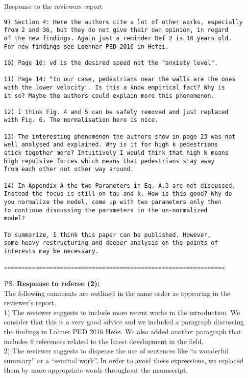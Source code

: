 \documentclass[a4paper,12pt]{letter}
\begin{document}
\begin{letter}{Response to the reviewers report}
\begin{verbatim}
9) Section 4: Here the authors cite a lot of other works, especially 
from 2 and 36, but they do not give their own opinion, in regard 
of the new findings. Again just a reminder Ref 2 is 10 years old. 
For new findings see Loehner PED 2016 in Hefei.

10) Page 10: vd is the desired speed not the "anxiety level".

11) Page 14: "In our case, pedestrians near the walls are the ones 
with the lower velocity". Is this a know empirical fact? Why is 
it so? Maybe the authors could explain more this phenomenon. 

12) I think Fig. 4 and 5 can be safely removed and just replaced 
with Fig. 6. The normalisation here is nice.

13) The interesting phenomenon the authors show in page 23 was not 
well analysed and explained. Why is it for high k pedestrians 
stick together more? Intuitively I would think that high k means 
high repulsive forces which means that pedestrians stay away 
from each other not other way around.

14) In Appendix A the two Parameters in Eq. A.3 are not discussed. 
Instead the focus is still on tau and k. How is this good? Why do 
you normalize the model, come up with two parameters only then 
to continue discussing the parameters in the un-normalized 
model?

To summarize, I think this paper can be published. However, 
some heavy restructuring and deeper analysis on the points of 
interests may be necessary. 

===============================================================

\end{verbatim}


\ps{\textbf{Response to referee (2):} \\

The following comments are outlined in the same order as appearing in the
reviewer’s report. \\

1) The reviewer suggests to include more recent works in the introduction. We consider that this
is a very good advice and we included a paragraph discussing the findings in L\"ohner PED 2016 Hefei.
We also added another paragraph that includes 6 references related to the latest development in the field. \\

2) The reviewer suggests to dispense the use of sentences like ``a wonderful 
summary'' or a ``seminal work''. In order to avoid these expressions, we 
replaced them by more appropriate words throughout the manuscript. \\

}
\end{letter}
\end{document}

